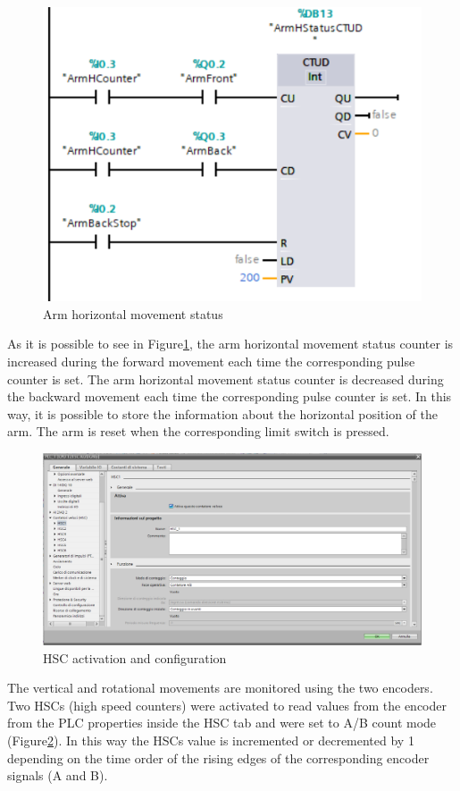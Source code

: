 \begin{figure}[!h]
\begin{center}
\includegraphics[width=0.6\linewidth]{capitolo3/figure/Segmento1_11.PNG}
\caption{Arm horizontal movement status}
\label{fig:arm_h_status}
\end{center}
\end{figure}

As it is possible to see in Figure\ref{fig:arm_h_status}, the arm horizontal movement status counter is increased during the forward movement each time the corresponding pulse counter is set. The arm horizontal movement status counter is decreased during the backward movement each time the corresponding pulse counter is set. In this way, it is possible to store the information about the horizontal position of the arm. The arm is reset when the corresponding limit switch is pressed.

\begin{figure}[!h]
\begin{center}
\includegraphics[width=0.8\linewidth]{capitolo3/figure/hsc_conf.PNG}
\caption{HSC activation and configuration}
\label{fig:hsc_config}
\end{center}
\end{figure}

The vertical and rotational movements are monitored using the two encoders. Two HSCs (high speed counters) were activated to read values from the encoder from the PLC properties inside the HSC tab and were set to A/B count mode (Figure\ref{fig:hsc_config}). In this way the HSCs value is incremented or decremented by 1 depending on the time order of the rising edges of the corresponding encoder signals (A and B).

